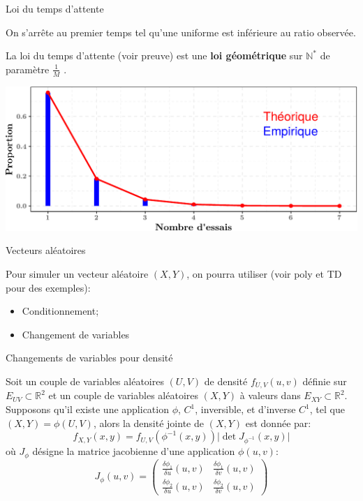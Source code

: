 \documentclass[ignorenonframetext,]{beamer}
\providecommand{\tightlist}{%
  \setlength{\itemsep}{0pt}\setlength{\parskip}{0pt}}
\newcommand{\R}{\mathbb{R}}
\begin{document}
\begin{frame}{Loi du temps d'attente}
\protect\hypertarget{loi-du-temps-dattente}{}

On s'arrête au premier temps tel qu'une uniforme est inférieure au ratio
observée.

La loi du temps d'attente (voir preuve) est une \textbf{loi géométrique}
sur \(\mathbb{N}^*\) de paramètre \(\frac{1}{M}\) .

\includegraphics{diapos_simulation_variables_aleatoires_files/figure-beamer/plot_temps_attente-1.pdf}

\end{frame}

\begin{frame}{Vecteurs aléatoires}
\protect\hypertarget{vecteurs-aluxe9atoires}{}

Pour simuler un vecteur aléatoire \((X, Y)\), on pourra utiliser (voir
poly et TD pour des exemples):

\begin{itemize}
\tightlist
\item
  Conditionnement;
\item
  Changement de variables
\end{itemize}

\end{frame}

\begin{frame}{Changements de variables pour densité}
\protect\hypertarget{changements-de-variables-pour-densituxe9}{}

Soit un couple de variables aléatoires \((U,V)\) de densité
\(f_{U,V}(u,v)\) définie sur \(E_{UV} \subset \R^2\) et un couple de
variables aléatoires \((X, Y)\) à valeurs dans \(E_{XY} \subset \R^2\).
Supposons qu'il existe une application \(\phi\), \(C^1\), inversible, et
d'inverse \(C^1\), tel que \((X, Y) = \phi(U, V)\), alors la densité
jointe de \((X, Y)\) est donnée par:
\[f_{X,Y}(x, y) = f_{U,V}(\phi^{-1}(x, y))\vert\det J_{\phi^{-1}}(x, y)\vert  \]
où \(J_\phi\) désigne la matrice jacobienne d'une application
\(\phi(u, v)\): \[J_\phi(u, v) = \begin{pmatrix}
\frac{\delta \phi_1}{\delta u}(u, v) & \frac{\delta \phi_1}{\delta v}(u, v)\\
\frac{\delta \phi_2}{\delta u}(u, v) & \frac{\delta \phi_2}{\delta v}(u, v)
\end{pmatrix}\]

\end{frame}
\end{document}
